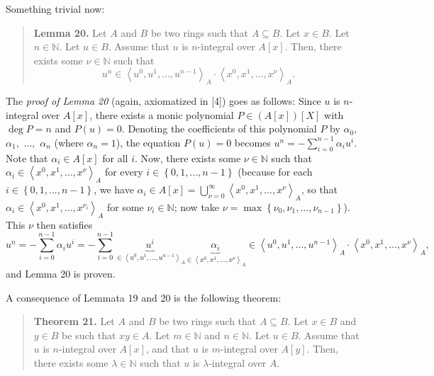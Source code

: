 \documentclass[12pt,final,notitlepage,onecolumn]{article}%
\begin{document}
Something trivial now:

\begin{quote}
\textbf{Lemma 20.} Let $A$ and $B$ be two rings such that $A\subseteq B$. Let
$x\in B$. Let $n\in\mathbb{N}$. Let $u\in B$. Assume that $u$ is $n$-integral
over $A\left[  x\right]  $. Then, there exists some $\nu\in\mathbb{N}$ such
that%
\[
u^{n}\in\left\langle u^{0},u^{1},...,u^{n-1}\right\rangle _{A}\cdot
\left\langle x^{0},x^{1},...,x^{\nu}\right\rangle _{A}.
\]



\end{quote}

The \textit{proof of Lemma 20} (again, axiomatized in [4]) goes as follows:
Since $u$ is $n$-integral over $A\left[  x\right]  $, there exists a monic
polynomial $P\in\left(  A\left[  x\right]  \right)  \left[  X\right]  $ with
$\deg P=n$ and $P\left(  u\right)  =0$. Denoting the coefficients of this
polynomial $P$ by $\alpha_{0},$ $\alpha_{1},$ $...,$ $\alpha_{n}$ (where
$\alpha_{n}=1$), the equation $P\left(  u\right)  =0$ becomes $u^{n}%
=-\sum\limits_{i=0}^{n-1}\alpha_{i}u^{i}$. Note that $\alpha_{i}\in A\left[
x\right]  $ for all $i$. Now, there exists some $\nu\in\mathbb{N}$ such that
$\alpha_{i}\in\left\langle x^{0},x^{1},...,x^{\nu}\right\rangle _{A}$ for
every $i\in\left\{  0,1,...,n-1\right\}  $ (because for each $i\in\left\{
0,1,...,n-1\right\}  $, we have $\alpha_{i}\in A\left[  x\right]
=\bigcup\limits_{\nu=0}^{\infty}\left\langle x^{0},x^{1},...,x^{\nu
}\right\rangle _{A}$, so that $\alpha_{i}\in\left\langle x^{0},x^{1}%
,...,x^{\nu_{i}}\right\rangle _{A}$ for some $\nu_{i}\in\mathbb{N}$; now take
$\nu=\max\left\{  \nu_{0},\nu_{1},...,\nu_{n-1}\right\}  $). This $\nu$ then
satisfies%
\[
u^{n}=-\sum\limits_{i=0}^{n-1}\alpha_{i}u^{i}=-\sum\limits_{i=0}%
^{n-1}\underbrace{u^{i}}_{\in\left\langle u^{0},u^{1},...,u^{n-1}\right\rangle
_{A}}\underbrace{\alpha_{i}}_{\in\left\langle x^{0},x^{1},...,x^{\nu
}\right\rangle _{A}}\in\left\langle u^{0},u^{1},...,u^{n-1}\right\rangle
_{A}\cdot\left\langle x^{0},x^{1},...,x^{\nu}\right\rangle _{A},
\]
and Lemma 20 is proven.

A consequence of Lemmata 19 and 20 is the following theorem:

\begin{quote}
\textbf{Theorem 21.} Let $A$ and $B$ be two rings such that $A\subseteq B$.
Let $x\in B$ and $y\in B$ be such that $xy\in A$. Let $m\in\mathbb{N}$ and
$n\in\mathbb{N}$. Let $u\in B$. Assume that $u$ is $n$-integral over $A\left[
x\right]  $, and that $u$ is $m$-integral over $A\left[  y\right]  $. Then,
there exists some $\lambda\in\mathbb{N}$ such that $u$ is $\lambda$-integral
over $A$.
\end{quote}
\end{document}
